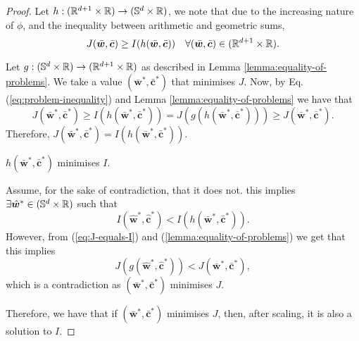 \documentclass[twoside]{article}
\begin{document}
\begin{proof}
	Let $h: (\mathbb{R}^{d + 1}\times \mathbb{R}) \to (\mathbb{S}^{d} \times \mathbb{R})$, we note that due to the increasing nature of $\phi$,
	and the inequality between arithmetic and geometric sums,
	\begin{equation}\label{eq:problem-inequality}
		J(\bar{\bm{w}}, \bar{\bm{c}}) \geq I(h(\bar{\bm{w}}, \bar{\bm{c}}))
		\quad \forall (\bar{\bm{w}}, \bar{\bm{c}}) \in (\mathbb{R}^{d + 1}\times \mathbb{R}).
	\end{equation}

	Let $g: (\mathbb{S}^{d} \times \mathbb{R}) \to (\mathbb{R}^{d + 1}\times \mathbb{R})$ as described in Lemma \ref{lemma:equality-of-problems}.
	We take a value $(\bar{\bm{w}}^{*}, \bar{\bm{c}}^{*})$ that minimises $J$.
	Now, by Eq. (\ref{eq:problem-inequality}) and Lemma \ref{lemma:equality-of-problems} we have that
	\begin{equation}\label{eq:J-equals-I}
		J(\bar{\bm{w}}^{*}, \bar{\bm{c}}^{*}) \geq I(h(\bar{\bm{w}}^{*}, \bar{\bm{c}}^{*})) 
        = J(g(h(\bar{\bm{w}}^{*}, \bar{\bm{c}}^{*}))) \geq J(\bar{\bm{w}}^{*}, \bar{\bm{c}}^{*}).
	\end{equation}
	Therefore, $J(\bar{\bm{w}}^{*}, \bar{\bm{c}}^{*}) = I(h(\bar{\bm{w}}^{*}, \bar{\bm{c}}^{*}))$.

	\begin{claim}
		$h(\bar{\bm{w}}^{*}, \bar{\bm{c}}^{*})$ minimises $I$.

		Assume, for the sake of contradiction, that it does not. this implies
		$\exists \hat{\bm{w}}^{*} \in (\mathbb{S}^{d} \times \mathbb{R})$ such that
		\begin{equation*}
			I(\hat{\bm{w}}^{*}, \hat{\bm{c}}^{*}) < I(h(\bar{\bm{w}}^{*}, \bar{\bm{c}}^{*})).
		\end{equation*}
		However, from (\ref{eq:J-equals-I}) and (\ref{lemma:equality-of-problems})
		we get that this implies
		\begin{equation*}
			J(g(\hat{\bm{w}}^{*}, \hat{\bm{c}}^{*})) < J(\bar{\bm{w}}^{*}, \bar{\bm{c}}^{*}),
		\end{equation*}
		which is a contradiction as $(\bar{\bm{w}}^{*}, \bar{\bm{c}}^{*})$ minimises $J$.
	\end{claim}
	Therefore, we have that if $(\bar{\bm{w}}^{*}, \bar{\bm{c}}^{*})$ minimises $J$, then,
	after scaling, it is also a solution to $I$.
\end{proof}
\end{document}
